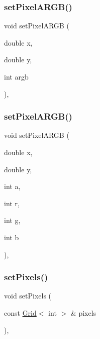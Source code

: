 \subsubsection{\texorpdfstring{set\+Pixel\+A\+R\+G\+B()}{setPixelARGB()}\hspace{0.1cm}{\footnotesize\ttfamily [1/2]}}
{\footnotesize\ttfamily void set\+Pixel\+A\+R\+GB (\begin{DoxyParamCaption}\item[{double}]{x,  }\item[{double}]{y,  }\item[{int}]{argb }\end{DoxyParamCaption})\hspace{0.3cm}{\ttfamily [virtual]}, {\ttfamily [inherited]}}

\mbox{\label{classGForwardDrawingSurface_a3de28156839da845f8d24503c9a3b111}} 
\subsubsection{\texorpdfstring{set\+Pixel\+A\+R\+G\+B()}{setPixelARGB()}\hspace{0.1cm}{\footnotesize\ttfamily [2/2]}}
{\footnotesize\ttfamily void set\+Pixel\+A\+R\+GB (\begin{DoxyParamCaption}\item[{double}]{x,  }\item[{double}]{y,  }\item[{int}]{a,  }\item[{int}]{r,  }\item[{int}]{g,  }\item[{int}]{b }\end{DoxyParamCaption})\hspace{0.3cm}{\ttfamily [virtual]}, {\ttfamily [inherited]}}

\mbox{\label{classGForwardDrawingSurface_a83fcae972f2677bf1ece054930f53162}} 
\subsubsection{\texorpdfstring{set\+Pixels()}{setPixels()}}
{\footnotesize\ttfamily void set\+Pixels (\begin{DoxyParamCaption}\item[{const \mbox{\hyperlink{classGrid}{Grid}}$<$ int $>$ \&}]{pixels }\end{DoxyParamCaption})\hspace{0.3cm}{\ttfamily [virtual]}, {\ttfamily [inherited]}}

